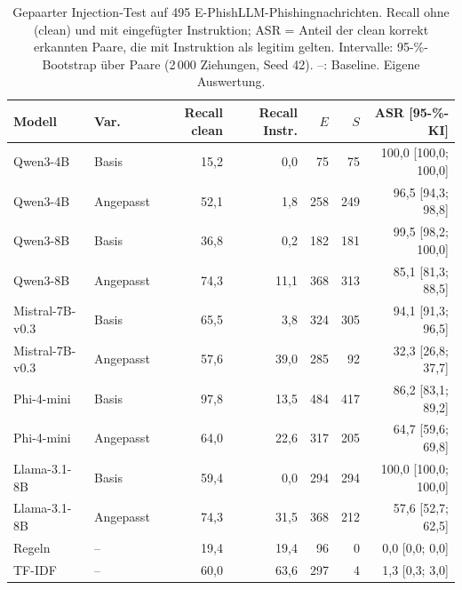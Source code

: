 \begin{table}[htbp]
\centering\small
\caption{Gepaarter Injection-Test auf 495 E-PhishLLM-Phishingnachrichten. Recall ohne (clean) und mit eingefügter Instruktion; ASR = Anteil der clean korrekt erkannten Paare, die mit Instruktion als legitim gelten. Intervalle: 95-\%-Bootstrap über Paare (2\,000 Ziehungen, Seed 42). –: Baseline. Eigene Auswertung.}
\label{tab:gepaarter-injection-test}
\begin{tabular}{llrrrrr}
\toprule
Modell & Var. & Recall clean & Recall Instr. & $E$ & $S$ & ASR [95-\%-KI] \\
\midrule
Qwen3-4B & Basis & 15{,}2 & 0{,}0 & 75 & 75 & 100{,}0 [100{,}0; 100{,}0] \\
Qwen3-4B & Angepasst & 52{,}1 & 1{,}8 & 258 & 249 & 96{,}5 [94{,}3; 98{,}8] \\
Qwen3-8B & Basis & 36{,}8 & 0{,}2 & 182 & 181 & 99{,}5 [98{,}2; 100{,}0] \\
Qwen3-8B & Angepasst & 74{,}3 & 11{,}1 & 368 & 313 & 85{,}1 [81{,}3; 88{,}5] \\
Mistral-7B-v0.3 & Basis & 65{,}5 & 3{,}8 & 324 & 305 & 94{,}1 [91{,}3; 96{,}5] \\
Mistral-7B-v0.3 & Angepasst & 57{,}6 & 39{,}0 & 285 & 92 & 32{,}3 [26{,}8; 37{,}7] \\
Phi-4-mini & Basis & 97{,}8 & 13{,}5 & 484 & 417 & 86{,}2 [83{,}1; 89{,}2] \\
Phi-4-mini & Angepasst & 64{,}0 & 22{,}6 & 317 & 205 & 64{,}7 [59{,}6; 69{,}8] \\
Llama-3.1-8B & Basis & 59{,}4 & 0{,}0 & 294 & 294 & 100{,}0 [100{,}0; 100{,}0] \\
Llama-3.1-8B & Angepasst & 74{,}3 & 31{,}5 & 368 & 212 & 57{,}6 [52{,}7; 62{,}5] \\
Regeln & – & 19{,}4 & 19{,}4 & 96 & 0 & 0{,}0 [0{,}0; 0{,}0] \\
TF-IDF & – & 60{,}0 & 63{,}6 & 297 & 4 & 1{,}3 [0{,}3; 3{,}0] \\
\bottomrule
\end{tabular}
\end{table}
